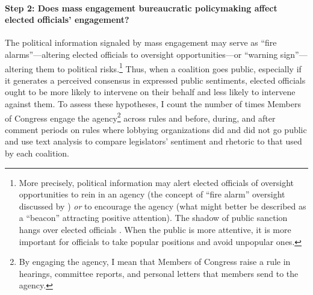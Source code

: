 
\paragraph{Step 2: Does mass engagement bureaucratic policymaking affect elected officials' engagement?}
The political information signaled by mass engagement may serve as ``fire alarms''---altering elected officials to oversight opportunities---or ``warning sign''---altering them to political risks.\footnote{
More precisely, political information may alert elected officials of oversight opportunities to rein in an agency (the concept of ``fire alarm'' oversight discussed by \citep{Mccubbins1984}) \emph{or} to encourage the agency (what might better be described as a ``beacon'' attracting positive attention).
The shadow of public sanction hangs over elected officials \citep{Arnold1979, Mayhew2000}. When the public is more attentive, it is more important for officials to take popular positions and avoid unpopular ones.
}
Thus, when a coalition goes public, especially if it generates a perceived consensus in expressed public sentiments, elected officials ought to be more likely to intervene on their behalf and less likely to intervene against them.  
To assess these hypotheses, I count the number of times Members of Congress engage the agency\footnote{
By engaging the agency, I mean that Members of Congress raise a rule in hearings, committee reports, and personal letters that members send to the agency.
}
across rules and before, during, and after comment periods on rules where lobbying organizations did and did not go public and use text analysis to compare legislators' sentiment and rhetoric to that used by each coalition.
